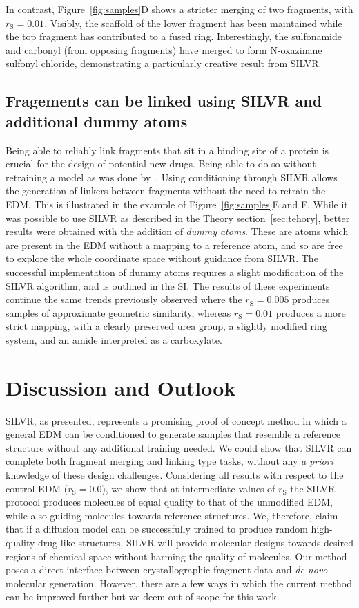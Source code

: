 \documentclass[journal=jacsat,manuscript=article]{achemso}
\begin{document}
In contrast, Figure~\ref{fig:samples}D shows a stricter merging of two fragments, with $r_{\mathrm{S}}=0.01$. Visibly, the scaffold of the lower fragment has been maintained while the top fragment has contributed to a fused ring. Interestingly, the sulfonamide and carbonyl (from opposing fragments) have merged to form N-oxazinane sulfonyl chloride, demonstrating a particularly creative result from SILVR. 

\subsection{Fragements can be linked using SILVR and additional dummy atoms}
\label{sec:linker}
Being able to reliably link fragments that sit in a binding site of a protein is crucial for the design of potential new drugs. Being able to do so without retraining a model as was done by~\cite{huang20223dlinker}. Using conditioning through SILVR allows the generation of linkers between fragments without the need to retrain the EDM. This is illustrated in the example of Figure~\ref{fig:samples}E and F. While it was possible to use SILVR as described in the Theory section~\ref{sec:tehory}, better results were obtained with the addition of \textit{dummy atoms}. These are atoms which are present in the EDM without a mapping to a reference atom, and so are free to explore the whole coordinate space without guidance from SILVR. The successful implementation of dummy atoms requires a slight modification of the SILVR algorithm, and is outlined in the SI. The results of these experiments continue the same trends previously observed where the $r_{\mathrm{S}}=0.005$ produces samples of approximate geometric similarity, whereas $r_{\mathrm{S}}=0.01$ produces a more strict mapping, with a clearly preserved urea group, a slightly modified ring system, and an amide interpreted as a carboxylate.

\section{Discussion and Outlook}
\label{sec:discussion}
SILVR, as presented, represents a promising proof of concept method in which a general EDM can be conditioned to generate samples that resemble a reference structure without any additional training needed. We could show that SILVR can complete both fragment merging and linking type tasks, without any \textit{a priori} knowledge of these design challenges. Considering all results with respect to the control EDM ($r_{\mathrm{S}}=0.0$), we show that at intermediate values of $r_{\mathrm{S}}$ the SILVR protocol produces molecules of equal quality to that of the unmodified EDM, while also guiding molecules towards reference structures. We, therefore, claim that if a diffusion model can be successfully trained to produce random high-quality drug-like structures, SILVR will provide molecular designs towards desired regions of chemical space without harming the quality of molecules. Our method poses a direct interface between crystallographic fragment data and \textit{de novo} molecular generation. However, there are a few ways in which the current method can be improved further but we deem out of scope for this work. 
\end{document}
